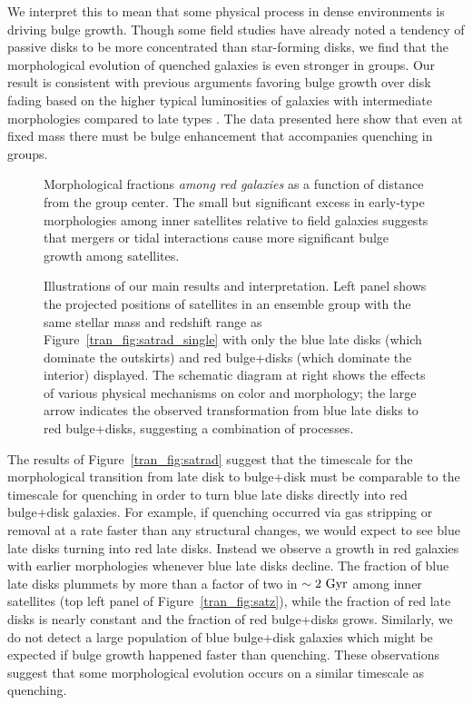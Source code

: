 We interpret this to mean that some physical process in dense
environments is driving bulge growth. Though some field studies \citep{Bundy2010, Masters2010}
have already noted a tendency of passive disks to be more concentrated than
star-forming disks, we find that the morphological evolution of
quenched galaxies is even stronger in groups. Our result is consistent with previous
arguments favoring bulge growth over disk fading based on the higher
typical luminosities of galaxies with intermediate morphologies
compared to late types \citep{Christlein2004,Burstein2005}. The data
presented here show that even at fixed mass there must be bulge enhancement
that accompanies quenching in groups.

\begin{figure}[htb]
\caption{Morphological fractions \textit{among red galaxies} as a
  function of distance from the group center. The small but
  significant excess in early-type morphologies among inner satellites
  relative to field galaxies suggests that mergers or tidal
  interactions cause more significant bulge growth among
  satellites.}
\label{tran_fig:satradred}
\end{figure}

\begin{figure}[htb]
\caption{Illustrations of our main results and interpretation. Left
  panel shows the projected positions of satellites in an ensemble
  group with the same stellar mass and redshift range as
  Figure~\ref{tran_fig:satrad_single} with only the blue late disks (which
  dominate the outskirts) and red bulge+disks (which dominate the
  interior) displayed. The schematic diagram at right shows the effects of various
  physical mechanisms on color and morphology; the large arrow
  indicates the observed transformation from blue late disks to red
  bulge+disks, suggesting a combination of processes.}
\label{tran_fig:cartoons}
\end{figure}

The results of Figure~\ref{tran_fig:satrad} suggest that the timescale for
the morphological transition from late disk to bulge+disk must be
comparable to the timescale for quenching in order to turn blue late
disks directly into red bulge+disk galaxies. For example, if quenching
occurred via gas stripping or removal at a rate faster than any
structural changes, we would expect to see blue late disks turning
into red late disks. Instead we observe a growth in red galaxies with
earlier morphologies whenever blue late disks decline.  The fraction
of blue late disks plummets by more than a factor of two in
$\sim2~{\rm Gyr}$ among inner satellites (top left panel of
Figure~\ref{tran_fig:satz}), while the fraction of red late disks is nearly
constant and the fraction of red bulge+disks grows. Similarly, we do
not detect a large population of blue bulge+disk galaxies which might
be expected if bulge growth happened faster than quenching. These
observations suggest that some morphological evolution occurs on a
similar timescale as quenching.

